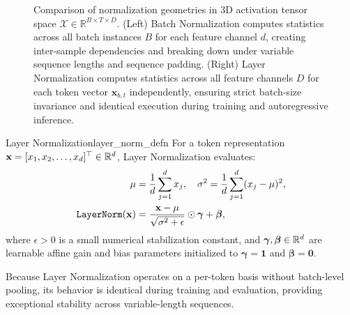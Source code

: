 \documentclass[../../main.tex]{subfiles}
\begin{document}
\begin{figure}[htbp]
{%
}
\caption{Comparison of normalization geometries in 3D activation tensor space $\mathcal{X} \in \mathbb{R}^{B \times T \times D}$. (Left) Batch Normalization computes statistics across all batch instances $B$ for each feature channel $d$, creating inter-sample dependencies and breaking down under variable sequence lengths and sequence padding. (Right) Layer Normalization computes statistics across all feature channels $D$ for each token vector $\mathbf{x}_{b,t}$ independently, ensuring strict batch-size invariance and identical execution during training and autoregressive inference.}
\label{fig:layer_normalization}
\end{figure}

\begin{definition}{Layer Normalization}{layer_norm_defn}
For a token representation $\mathbf{x} = [x_1, x_2, \dots, x_d]^\top \in \mathbb{R}^d$, Layer Normalization evaluates:
\begin{align}
\mu &= \frac{1}{d} \sum_{j=1}^d x_j, \quad \sigma^2 = \frac{1}{d} \sum_{j=1}^d (x_j - \mu)^2, \\
\label{eq:layer_norm_formula}
\text{\texttt{LayerNorm}}(\mathbf{x}) &= \frac{\mathbf{x} - \mu}{\sqrt{\sigma^2 + \epsilon}} \odot \boldsymbol{\gamma} + \boldsymbol{\beta},
\end{align}
where $\epsilon > 0$ is a small numerical stabilization constant, and $\boldsymbol{\gamma}, \boldsymbol{\beta} \in \mathbb{R}^d$ are learnable affine gain and bias parameters initialized to $\boldsymbol{\gamma} = \mathbf{1}$ and $\boldsymbol{\beta} = \mathbf{0}$.
\end{definition}
Because Layer Normalization operates on a per-token basis without batch-level pooling, its behavior is identical during training and evaluation, providing exceptional stability across variable-length sequences.
\end{document}
